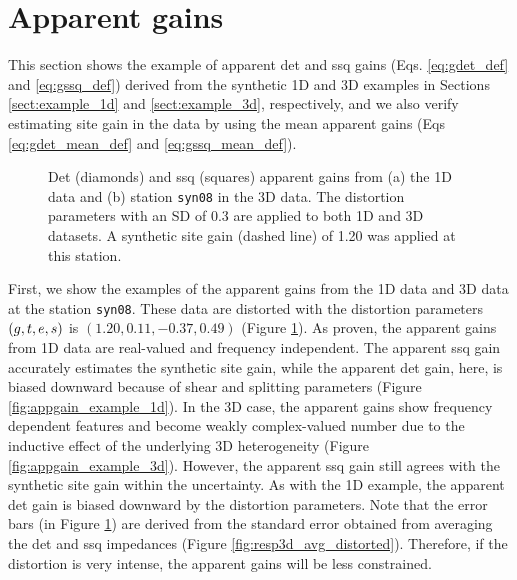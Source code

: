 
\renewcommand{\thisdir}{_content/appgain}
\renewcommand{\figdir}{\thisdir/_fig}
\section{Apparent gains}

	This section shows the example of apparent det and ssq gains (Eqs. \ref{eq:gdet_def} and \ref{eq:gssq_def}) derived from the synthetic 1D and 3D examples in Sections \ref{sect:example_1d} and \ref{sect:example_3d}, respectively, and we also verify estimating site gain in the data by using the mean apparent gains (Eqs \ref{eq:gdet_mean_def} and \ref{eq:gssq_mean_def}).

\begin{figure}[!b]
	\centering
	\caption[Example of apparent gains from 1D and 3D data]{Det (diamonds) and ssq (squares) apparent gains from (a) the 1D data and (b) station \texttt{syn08} in the 3D data. The distortion parameters with an SD of 0.3 are applied to both 1D and 3D datasets. 
	A synthetic site gain (dashed line) of 1.20 was applied at this station.}
	\label{fig:appgain_example}
\end{figure}

First, we show the examples of the apparent gains from the 1D data and 3D data at the station \texttt{syn08}. These data are distorted with the distortion parameters $(g,t,e,s)$ is $(1.20, 0.11, -0.37, 0.49)$ (Figure \ref{fig:appgain_example}). 
%
As proven, the apparent gains from 1D data are real-valued and frequency independent. The apparent ssq gain accurately estimates the synthetic site gain, while the apparent det gain, here, is biased downward because of shear and splitting parameters (Figure \ref{fig:appgain_example_1d}). 
%
In the 3D case, the apparent gains show frequency dependent features and become weakly complex-valued number due to the inductive effect of the underlying 3D heterogeneity (Figure \ref{fig:appgain_example_3d}). 
%
However, the apparent ssq gain still agrees with the synthetic site gain within the uncertainty. As with the 1D example, the apparent det gain is biased downward by the distortion parameters. 
%
Note that the error bars (in Figure \ref{fig:appgain_example}) are derived from the standard error obtained from averaging the det and ssq impedances (Figure \ref{fig:resp3d_avg_distorted}). 
Therefore, if the distortion is very intense, the apparent gains will be less constrained.



